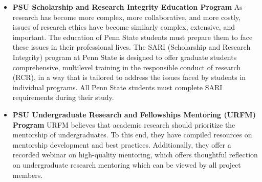 \documentclass[11pt]{article}
\begin{document}
\begin{itemize}
\item \textbf{PSU Scholarship and Research Integrity Education Program} As research has become more complex, more collaborative, and more costly, issues of research ethics have become similarly complex, extensive, and important. The education of Penn State  students must prepare them to face these issues in their professional lives. The SARI (Scholarship and Research Integrity) program at Penn State is designed to offer graduate students comprehensive, multilevel training in the responsible conduct of research (RCR), in a way that is tailored to address the issues faced by students in individual programs.
All Penn State students must complete SARI requirements during their study.

\item \textbf{PSU Undergraduate Research and Fellowships Mentoring (URFM) Program} URFM believes that academic research should prioritize the mentorship of undergraduates. To this end, they have compiled resources on mentorship development and best practices. Additionally, they offer a recorded webinar on high-quality mentoring, which offers thoughtful reflection on undergraduate research mentoring which can be viewed by all project members.


\end{itemize}
\end{document}
